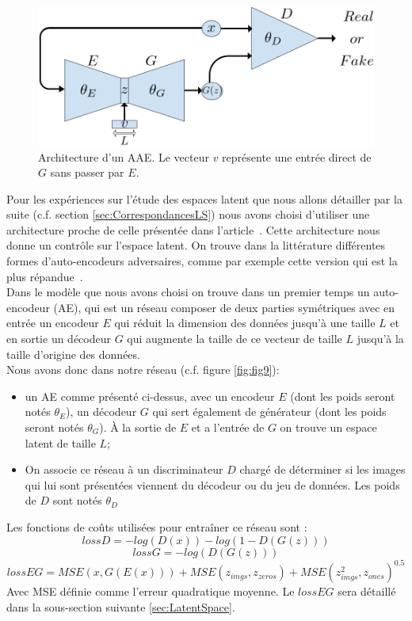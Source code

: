 \documentclass[11pt,francais]{article}
\begin{document}
\begin{figure}[h!]
    \centering
    \includegraphics[width=\textwidth]{Figures/GAN/AAE_representation.png}
    \caption{Architecture d'un AAE. Le vecteur \(v\) représente une entrée direct de \(G\) sans passer par \(E\).}
    \label{fig:fig10}
\end{figure}

Pour les expériences sur l'étude des espaces latent que nous allons détailler par la suite (c.f. section \ref{sec:CorrespondancesLS}) nous avons choisi d'utiliser une architecture proche de celle présentée dans l'article~\cite{GADAE}. Cette architecture nous donne un contrôle sur l'espace latent.
On trouve dans la littérature différentes formes d'auto-encodeurs adversaires, comme par exemple cette version qui est la plus répandue~\cite{makhzani2015adversarial}.\\
Dans le modèle que nous avons choisi on trouve dans un premier temps un auto-encodeur (AE), qui est un réseau composer de deux parties symétriques avec en entrée un encodeur \(E\) qui réduit la dimension des données jusqu'à une taille \(L\) et en sortie un décodeur \(G\) qui augmente la taille de ce vecteur de taille \(L\) jusqu'à la taille d'origine des données. \\
Nous avons donc dans notre réseau (c.f. figure \ref{fig:fig9}):
\begin{itemize}
  \item un AE comme présenté ci-dessus, avec un encodeur \(E\) (dont les poids seront notés \(\theta_E\)), un décodeur \(G\) qui sert également de générateur (dont les poids seront notés \(\theta_G\)). À la sortie de \(E\) et a l'entrée de \(G\) on trouve un espace latent de taille \(L\);
  \item On associe ce réseau à un discriminateur \(D\) chargé de déterminer si les images qui lui sont présentées viennent du décodeur ou du jeu de données. Les poids de \(D\) sont notés \(\theta_D\) 
\end{itemize}
Les fonctions de coûts utilisées pour entraîner ce réseau sont :
\[
lossD = -log(D(x)) - log(1-D(G(z)))
\]
\[
lossG = -log(D(G(z)))
\]
\[
lossEG = MSE(x, G(E(x))) + MSE(z_{imgs}, z_{zeros}) + MSE(z_{imgs}^2, z_{ones})^{0.5}
\]
Avec MSE définie comme l'erreur quadratique moyenne.
Le \(lossEG\) sera détaillé dans la sous-section suivante \ref{sec:LatentSpace}.
\end{document}
